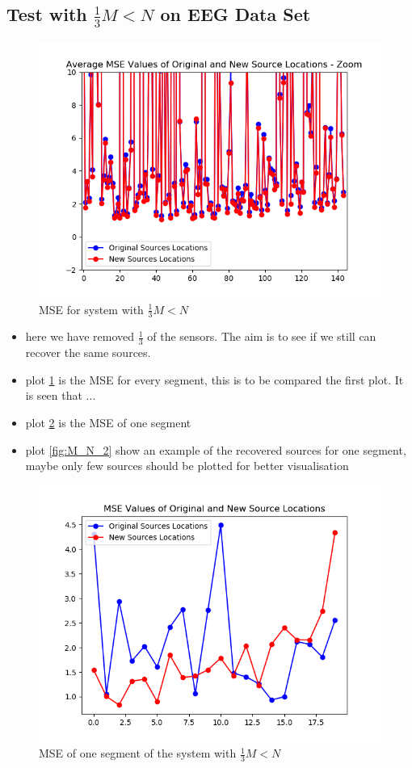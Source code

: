 \subsection{Test with $\frac{1}{3} M<N$ on EEG Data Set}
\begin{figure}[H]
    \centering
	\includegraphics[scale=0.5]{figures/ch_7/M_N_1.png}
	\caption{MSE for system with $\frac{1}{3} M<N$}
	\label{fig:M_N_1}
\end{figure}  
\begin{itemize}
\item  here we have removed $\frac{1}{3}$ of the sensors. The aim is to see if we still can recover the same sources. 
\item plot \ref{fig:M_N_1} is the MSE for every segment, this is to be compared the first plot. It is seen that ...
\item plot \ref{fig:M_N_3} is the MSE of one segment 
\item plot \ref{fig:M_N_2} show an example of the recovered sources for one segment, maybe only few sources should be plotted for better visualisation
\end{itemize}
\begin{figure}[H]
    \centering
	\includegraphics[scale=0.5]{figures/ch_7/M_N_3.png}
	\caption{MSE of one segment of the system with $\frac{1}{3} M<N$}
	\label{fig:M_N_3}
\end{figure}
